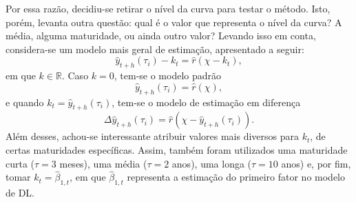 \documentclass[
	12pt,				%
	openright,			%
	oneside,			%
	a4paper,			%
	english,			%
	brazil				%
	]{dissertacao-ufrgs-abntex2}
\begin{document}
Por essa razão, decidiu-se retirar o nível da curva para testar o método. Isto, porém, levanta outra questão: qual é o valor que representa o nível da curva? A média, alguma maturidade, ou ainda outro valor? Levando isso em conta, considera-se um modelo mais geral de estimação, apresentado a seguir:
\begin{equation}
\hat{y}_{t+h}(\tau_i) - k_t = \hat{r}(\chi - k_t),
\end{equation}
em que $k \in \mathbb{R}$. Caso $k=0$, tem-se o modelo padrão
\begin{equation}
\hat{y}_{t+h}(\tau_i) = \hat{r}(\chi),
\end{equation}
e quando $k_t = \hat{y}_{t+h}(\tau_i)$, tem-se o modelo de estimação em diferença
\begin{equation}
\Delta \hat{y}_{t+h}(\tau_i)= \hat{r}(\chi - \hat{y}_{t+h}(\tau_i)).
\end{equation}
Além desses, achou-se interessante atribuir valores mais diversos para $k_t$, de certas maturidades específicas. Assim, também foram utilizados uma maturidade curta ($\tau = 3$ meses), uma média ($\tau = 2$ anos), uma longa ($\tau = 10$ anos) e, por fim, tomar $k_t = \hat{\beta}_{1,t}$, em que $\hat{\beta}_{1,t}$ representa a estimação do primeiro fator no modelo de DL. 
\end{document}

